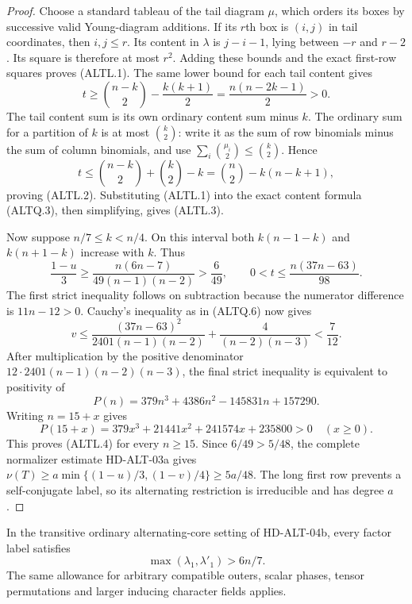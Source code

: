 \begin{proof}
Choose a standard tableau of the tail diagram $\mu$, which orders its
boxes by successive valid Young-diagram additions. If its $r$th box
is $(i,j)$ in tail coordinates, then $i,j\le r$. Its content in
$\lambda$ is $j-i-1$, lying between $-r$ and $r-2$. Its square is
therefore at most $r^2$. Adding these bounds and the exact first-row
squares proves (ALTL.1). The same lower bound for each tail content
gives
\[
 t\ge\binom{n-k}{2}-\frac{k(k+1)}2
     =\frac{n(n-2k-1)}2>0.
\]
The tail content sum is its own ordinary content sum minus $k$.
The ordinary sum for a partition of $k$ is at most $\binom k2$:
write it as the sum of row binomials minus the sum of column
binomials, and use $\sum_i\binom{\mu_i}{2}\le\binom k2$.
Hence
\[
 t\le\binom{n-k}{2}+\binom k2-k
       =\binom n2-k(n-k+1),
\]
proving (ALTL.2). Substituting (ALTL.1) into the exact content
formula (ALTQ.3), then simplifying, gives (ALTL.3).

Now suppose $n/7\le k<n/4$. On this interval both
$k(n-1-k)$ and $k(n+1-k)$ increase with $k$. Thus
\[
 \frac{1-u}{3}\ge\frac{n(6n-7)}{49(n-1)(n-2)}
                 >\frac6{49},\qquad
 0<t\le\frac{n(37n-63)}{98}.
                                                               \tag{ALTL.5}
\]
The first strict inequality follows on subtraction because the
numerator difference is $11n-12>0$. Cauchy's inequality as in
(ALTQ.6) now gives
\[
 v\le\frac{(37n-63)^2}{2401(n-1)(n-2)}
                +\frac4{(n-2)(n-3)}<\frac7{12}.
                                                               \tag{ALTL.6}
\]
After multiplication by the positive denominator
$12\cdot2401(n-1)(n-2)(n-3)$, the final strict inequality
is equivalent to positivity of
\[
 P(n)=379n^3+4386n^2-145831n+157290.
\]
Writing $n=15+x$ gives
\[
 P(15+x)=379x^3+21441x^2+241574x+235800>0
                         \quad(x\ge0).
\]
This proves (ALTL.4) for every $n\ge15$. Since
$6/49>5/48$, the complete normalizer estimate HD-ALT-03a gives
$\nu(T)\ge a\min\{(1-u)/3,(1-v)/4\}\ge5a/48$.
The long first row prevents a self-conjugate label, so its
alternating restriction is irreducible and has degree $a$.
\end{proof}

\begin{theorem}
\label{HD-ALT-05b}
In the transitive ordinary alternating-core setting of HD-ALT-04b,
every factor label satisfies
\[
                    \max(\lambda_1,\lambda'_1)>6n/7.
                                                               \tag{ALTL.7}
\]
The same allowance for arbitrary compatible outers, scalar phases,
tensor permutations and larger inducing character fields applies.
\end{theorem}

